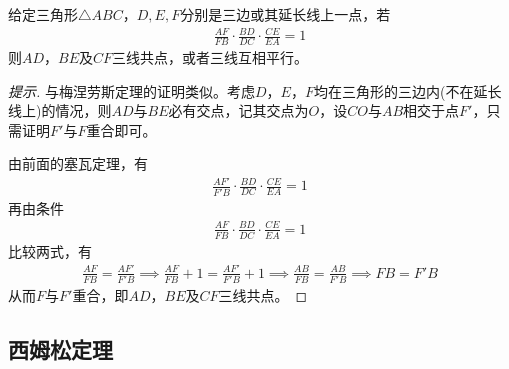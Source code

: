 \begin{theorem}
  给定三角形$\triangle ABC$，$D,E,F$分别是三边或其延长线上一点，若
  \begin{align*}
    \frac{AF}{FB}\cdot\frac{BD}{DC}\cdot\frac{CE}{EA}=1
  \end{align*}
  则$AD$，$BE$及$CF$三线共点，或者三线互相平行。
  \begin{center}
  \end{center}
\end{theorem}
\begin{proof}[提示]
  与梅涅劳斯定理的证明类似。考虑$D$，$E$，$F$均在三角形的三边内(不在延长线上)的情况，则$AD$与$BE$必有交点，记其交点为$O$，设$CO$与$AB$相交于点$F'$，只需证明$F'$与$F$重合即可。

  由前面的塞瓦定理，有
  \begin{align*}
    \frac{AF'}{F'B}\cdot\frac{BD}{DC}\cdot\frac{CE}{EA}=1
  \end{align*}
  再由条件
  \begin{align*}
    \frac{AF}{FB}\cdot\frac{BD}{DC}\cdot\frac{CE}{EA}=1
  \end{align*}
  比较两式，有
  \begin{align*}
    \frac{AF}{FB}=\frac{AF'}{F'B} \implies
    \frac{AF}{FB}+1=\frac{AF'}{F'B}+1 \implies
    \frac{AB}{FB}=\frac{AB}{F'B} \implies 
    FB=F'B
  \end{align*}
  从而$F$与$F'$重合，即$AD$，$BE$及$CF$三线共点。
\end{proof}

\subsection{西姆松定理}
\label{sec:simsons-theorem}

